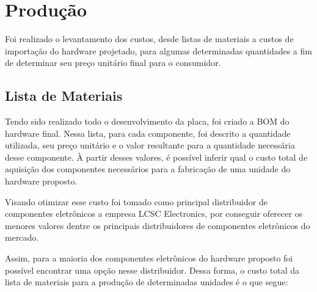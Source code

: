 \section{Produção}

Foi realizado o levantamento dos custos, desde listas de materiais a custos de importação do hardware projetado, para algumas determinadas quantidades a fim de determinar seu preço unitário final para o consumidor.

\subsection{Lista de Materiais}

Tendo sido realizado todo o desenvolvimento da placa, foi criado a \gls{BOM} do hardware final. Nessa lista, para cada componente, foi descrito a quantidade utilizada, seu preço unitário e o valor resultante para a quantidade necessária desse componente. À partir desses valores, é possível inferir qual o custo total de aquisição dos componentes necessários para a fabricação de uma unidade do hardware proposto. 

Visando otimizar esse custo foi tomado como principal distribuidor de componentes eletrônicos a empresa LCSC Electronics, por conseguir oferecer os menores valores dentre os principais distribuidores de componentes eletrônicos do mercado. 

Assim, para a maioria dos componentes eletrônicos do hardware proposto foi possível encontrar uma opção nesse distribuidor. Dessa forma, o custo total da lista de materiais para a produção de determinadas unidades é o que segue:

	\begin{table}[!h]
	\captionsetup{width=7cm}%
    \end{table}





